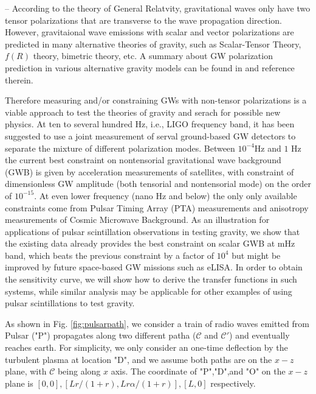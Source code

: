 \documentclass[prl,aps,floatfix,superscriptaddress,twocolumn]{revtex4}
\begin{document}
 -- According to the theory of General Relatvity, gravitational waves only have two tensor polarizations that are transverse to the wave propagation direction. However, gravitaional wave emissions with scalar and vector polarizations are predicted in many alternative theories of gravity, such as Scalar-Tensor Theory, $f(R)$ theory, bimetric theory, etc. A summary about GW polarization prediction in various alternative gravity models can be found in \cite{Nishizawa2009} and reference therein. 

Therefore measuring and/or constraining GWs with non-tensor polarizations is a viable approach to test the theories of gravity and serach for possible new physics. At ten to several hundred Hz, i.e., LIGO frequency band, it has been suggested \cite{Nishizawa2009,Nishizawa2013} to use a joint measurement of serval ground-based GW detectors to separate the mixture of different polarization modes. Between $10^{-4}$Hz and $1$ Hz the current best constraint on nontensorial gravitational wave background (GWB) is given by acceleration measurements of satellites, with constraint of dimensionless GW amplitude (both tensorial and nontensorial mode) on the order of $10^{-15}$. At even lower frequency (nano Hz and below) the only only available constraints come from Pulsar Timing Array (PTA) measurements and anisotropy measurements of Cosmic Microwave Background. As an illustration for applications of pulsar scintillation observations in testing gravity, we show that the existing data already provides the best constraint on scalar GWB at mHz band, which beats the previous constraint by a factor of $10^4$ but might be improved by future space-based GW missions such as eLISA. In order to obtain the sensitivity curve, we will show how to derive the transfer functions in such systems, while similar analysis may be applicable for other examples of using pulsar scintillations to test gravity.

As shown in Fig. \ref{fig:pulsarpath}, we consider a train of radio waves emitted from Pulsar ("P") propagates along two different patha ($\mathcal{C}$ and $\mathcal{C}'$) and eventually reaches earth. For simplicity, we only consider an one-time deflection by the turbulent plasma at location "D", and we assume both paths are on the $x-z$ plane, with $\mathcal{C}$ being along $x$ axis. The coordinate of "P","D",and "O" on the $x-z$ plane is $[0,0],[L r/(1+r), L r \alpha/(1+r)], [L, 0]$ respectively.
\end{document}
